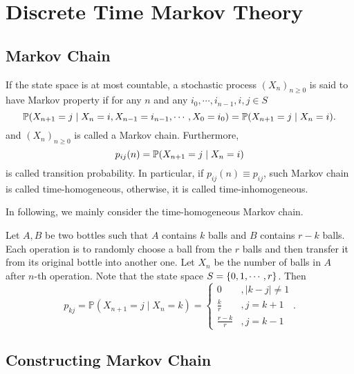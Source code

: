 \chapter{Discrete Time Markov Theory}

\section{Markov Chain}

\begin{defn}
    If the state space is at most countable, a stochastic process $(X_n)_{n \geq 0}$ is said to have Markov property if for any $n$ and any $i_0,\cdots,i_{n-1},i,j \in S$
    \begin{equation*}
        \mathbb{P}(X_{n+1} = j \mid X_n = i, X_{n-1} = i_{n-1},\cdots,X_0 = i_0) = \mathbb{P}(X_{n+1} = j \mid X_n = i).
    \end{equation*}
    and $(X_n)_{n \geq 0}$ is called a Markov chain. Furthermore,
    \begin{equation*}
        p_{ij}(n) = \mathbb{P}(X_{n+1} = j \mid X_n = i)
    \end{equation*}
    is called transition probability. In particular, if $p_{ij}(n) \equiv p_{ij}$, such Markov chain is called time-homogeneous, otherwise, it is called time-inhomogeneous.
\end{defn}

\noindent In following, we mainly consider the time-homogeneous Markov chain.

\begin{exam}
    Let $A,B$ be two bottles such that $A$ contains $k$ balls and $B$ contains $r-k$ balls. Each operation is to randomly choose a ball from the $r$ balls and then transfer it from its original bottle into another one. Let $X_n$ be the number of balls in $A$ after $n$-th operation. Note that the state space $S = \left\{0,1,\cdots, r\right\}$. Then
    \begin{equation*}
        p_{k j}=\mathbb{P}\left(X_{n+1}=j \mid X_n=k\right) = \begin{cases}0 & ,|k-j| \neq 1 \\ \frac{k}{r} & , j=k+1 \\ \frac{r-k}{r} & , j=k-1\end{cases}.
    \end{equation*}
\end{exam}


\section{Constructing Markov Chain}

